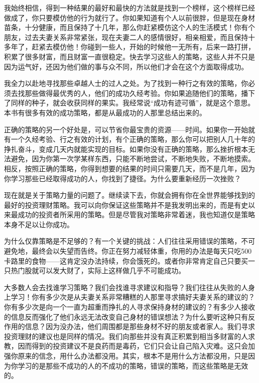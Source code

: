 我始终相信，得到一种结果的最好和最快的方法就是找到一个榜样，这个榜样已经做成了，你只要模仿他的行为就行了。你如果知道有个人以前很胖，但是现在身材苗条，十分健康，而且保持了十几年，那么你赶紧模仿这个人的生活模式！你有个朋友，过去夫妻关系非常紧张，现在夫妻二人的感情很好，相亲相爱，而且保持十多年了，赶紧去模仿他！你碰到一些人，开始的时候他一无所有，后来一路打拼，积累了很多财富，而且财富一直很稳定。快去学习这些人的策略，这些人并不只是因为运气好，还因为他们做的事与众不同，所以他们才会在这个方面取得成功。

我全力以赴地寻找那些卓越人士的过人之处。为了找到一种行之有效的策略，你必须去找那些做得最优秀的人，他们的成功久经考验。你如果追随他们的策略，播下了同样的种子，就会收获同样的果实。我经常说“成功有迹可循”，就是这个意思。本书有很多有效的成功策略，都是从最成功的人那里总结出来的。

正确的策略的另一个好处是，可以节省你最宝贵的资源——时间。如果你一开始就有一个久经考验、行之有效的计划，有个正确的策略，那么你可以把别人几十年的挣扎奋斗，变成几天内就能实现的目标。如果你没有正确的策略，那么挫折根本无法避免，因为你第一次学某样东西，只能不断地尝试，不断地失败，不断地摸索。相反，按照正确的策略，你得到想要的结果的时间只需要几天，而不是几年，因为你学习那些已经取得成功的人，你找到了捷径。为什么要重新经历一次挫败？

现在就是关于策略力量的问题了。继续读下去，你就会拥有你在全世界能够找到的最好的投资理财策略。我可以向你保证这些策略并不是我发明出来的，而是有史以来最成功的投资者所采用的策略。但是尽管我对策略非常着迷，我也知道仅是策略本身不足以让你成功。

为什么仅靠策略是不足够的？有一个关键的挑战：人们往往采用错误的策略，不可避免地，最终会以失望而告终。你正在努力减轻体重，你用的办法是每天只吃500卡路里的食物——这肯定没办法持续，你会饿死的。或者你非常肯定自己只要买一只热门股就可以发大财了，实际上这样做几乎不可能成功。

大多数人会去找谁学习策略？我们会找谁寻求建议和指导？我们往往从失败的人身上学习！你有多少次是从夫妻关系非常糟糕的人那里寻求搞好夫妻关系的建议的？你有多少次是向一个一直为超重而挣扎的人寻求保持身材的建议的？有多少人接收的信息反而强化了他们永远无法改变自己身材的错误想法？为什么要听这种只有反作用的信息？因为没办法，他们周围都是那些身材不好的朋友或者家人。我们寻求投资理财的建议也是同样的情况。我们向那些并没有真正积累到相当多财富的人求教，因而得到的投资建议不是良药而是毒药，它们只会让自己陷入灾难。这只会加强你原来的信念，用什么办法都没用。其实，根本不是用什么方法都没用，只是因为你学习的是那些不成功的人的不成功的策略，错误的策略，而这些策略是无效的。

